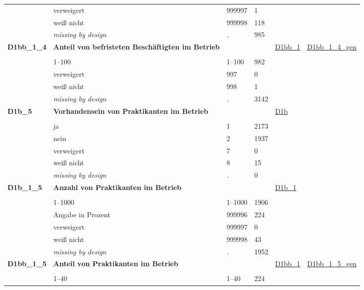 \begin{longtable}{| L{2.45cm} | L{6cm} | C{1.5cm} | R{1cm} | C{2.25cm} | C{2.25cm} |}
   & verweigert & 999997 & 1 &  &  \\ 
   & weiß nicht & 999998 & 118 &  &  \\ 
   & \textit{missing by design} & \textit{.} & 985 &  &  \\ 
   \midrule
\textbf{D1bb\_1\_4}\label{var:D1bb:1:4} & \textbf{Anteil von befristeten Beschäftigten im Betrieb} &  &  & \hyperref[D1bb:1]{D1bb\_1} & \hyperref[var:suf:D1bb:1:4:gen]{D1bb\_1\_4\_gen} \\ 
   &  &  &  &  &  \\ 
   & 1--100 & 1--100 & 982 &  &  \\ 
   & verweigert & 997 & 0 &  &  \\ 
   & weiß nicht & 998 & 1 &  &  \\ 
   & \textit{missing by design} & \textit{.} & 3142 &  &  \\ 
   \midrule
\textbf{D1b\_5}\label{var:D1b:5} & \textbf{Vorhandensein von Praktikanten im Betrieb} &  &  & \hyperref[D1b]{D1b} & \hyperref[var:suf:]{} \\ 
   &  &  &  &  &  \\ 
   & ja & 1 & 2173 &  &  \\ 
   & nein & 2 & 1937 &  &  \\ 
   & verweigert & 7 & 0 &  &  \\ 
   & weiß nicht & 8 & 15 &  &  \\ 
   & \textit{missing by design} & \textit{.} & 0 &  &  \\ 
   \midrule
\textbf{D1b\_1\_5}\label{var:D1b:1:5} & \textbf{Anzahl von Praktikanten im Betrieb} &  &  & \hyperref[D1b:1]{D1b\_1} & \hyperref[var:suf:]{} \\ 
   &  &  &  &  &  \\ 
   & 1--1000 & 1--1000 & 1906 &  &  \\ 
   & Angabe in Prozent & 999996 & 224 &  &  \\ 
   & verweigert & 999997 & 0 &  &  \\ 
   & weiß nicht & 999998 & 43 &  &  \\ 
   & \textit{missing by design} & \textit{.} & 1952 &  &  \\ 
   \midrule
\textbf{D1bb\_1\_5}\label{var:D1bb:1:5} & \textbf{Anteil von Praktikanten im Betrieb} &  &  & \hyperref[D1bb:1]{D1bb\_1} & \hyperref[var:suf:D1bb:1:5:gen]{D1bb\_1\_5\_gen} \\ 
   &  &  &  &  &  \\ 
   & 1--40 & 1--40 & 224 &  &  \\ 

\end{longtable}
